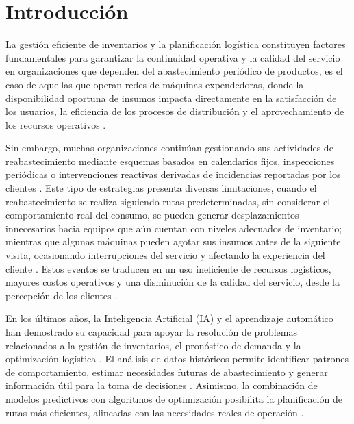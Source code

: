 \section{Introducción}\label{introducciuxf3n}

La gestión eficiente de inventarios y la planificación logística constituyen factores fundamentales para garantizar la continuidad operativa y la calidad del servicio en organizaciones que dependen del abastecimiento periódico de productos, es el caso de aquellas que operan redes de máquinas expendedoras, donde la disponibilidad oportuna de insumos impacta directamente en la satisfacción de los usuarios, la eficiencia de los procesos de distribución y el aprovechamiento de los recursos operativos \citep{grzybowska2020,mehmood2023}.

Sin embargo, muchas organizaciones continúan gestionando sus actividades de reabastecimiento mediante esquemas basados en calendarios fijos, inspecciones periódicas o intervenciones reactivas derivadas de incidencias reportadas por los clientes \citep{rosello2023}. Este tipo de estrategias presenta diversas limitaciones, cuando el reabastecimiento se realiza siguiendo rutas predeterminadas, sin considerar el comportamiento real del consumo, se pueden generar desplazamientos innecesarios hacia equipos que aún cuentan con niveles adecuados de inventario; mientras que algunas máquinas pueden agotar sus insumos antes de la siguiente visita, ocasionando interrupciones del servicio y afectando la experiencia del cliente \citep{aguas2025}. Estos eventos se traducen en un uso ineficiente de recursos logísticos, mayores costos operativos y una disminución de la calidad del servicio, desde la percepción de los clientes \citep{grzybowska2020}.

En los últimos años, la Inteligencia Artificial (IA) y el aprendizaje automático han demostrado su capacidad para apoyar la resolución de problemas relacionados a la gestión de inventarios, el pronóstico de demanda y la optimización logística \citep{puma2025}. El análisis de datos históricos permite identificar patrones de comportamiento, estimar necesidades futuras de abastecimiento y generar información útil para la toma de decisiones \citep{mehmood2023}. Asimismo, la combinación de modelos predictivos con algoritmos de optimización posibilita la planificación de rutas más eficientes, alineadas con las necesidades reales de operación \citep{grzybowska2020}.

